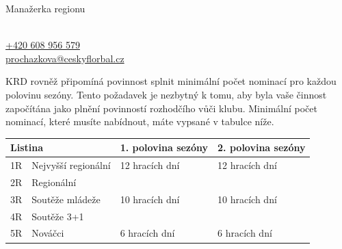 \documentclass{newsletter_2025}
\begin{document}
\begin{admonition-info}{Manažerka regionu}
	\begin{flushleft}
		\hspace{0.5em} %
		\parbox{8cm}{ %
			\textcolor{cfblue}{{\large {}}}
			\\
			{\small \href{tel:608956579}{+420 608 956 579}}\\
			{\small \href{mailto:prochazkova@ceskyflorbal.cz}{prochazkova@ceskyflorbal.cz}}
		}
	\end{flushleft}
\end{admonition-info}

KRD rovněž připomíná povinnost splnit minimální počet nominací pro každou polovinu sezóny. Tento požadavek je nezbytný k tomu, aby byla vaše činnost započítána jako plnění povinností rozhodčího vůči klubu. Minimální počet nominací, které musíte nabídnout, máte vypsané v tabulce níže.

\begin{table}[h]
	\centering
	\renewcommand{\arraystretch}{2}
	\begin{tabularx}{\textwidth}{| r | l | X | X |}
		\hline
		\multicolumn{2}{|l|}{\textbf{Listina}} & \textbf{1. polovina sezóny}  & \textbf{2. polovina sezóny} \\
		\hline
		1R & Nejvyšší regionální & 12 hracích dní & 12 hracích dní \\
		\hline
		2R & Regionální & \multirow{3}{*}{10 hracích dní} & \multirow{3}{*}{10 hracích dní} \\
		\cline{1-2}
		3R & Soutěže mládeže & & \\
		\cline{1-2}
		4R & Soutěže 3+1 & & \\
		\hline
		5R & Nováčci & 6 hracích dní & 6 hracích dní\\
		\hline
	\end{tabularx}
\end{table}
\end{document}
